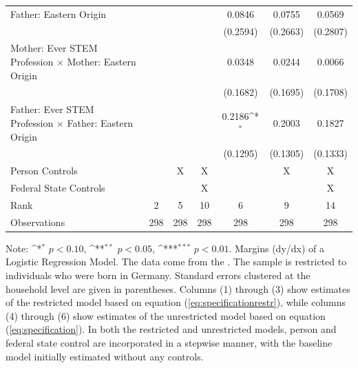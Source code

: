 \documentclass[a4paper, oneside, hyperfootnotes = false]{article}
\def\sym#1{\ifmmode^{#1}\else\(^{#1}\)\fi}
\begin{document}
{\begin{landscape}
\begin{table}[ht]
\begin{center}
{\begin{tabular}{l*{6}{c}}
					\addlinespace
					Father: Eastern Origin&                     &                     &                     &      0.0846         &      0.0755         &      0.0569         \\
					&                     &                     &                     &    (0.2594)         &    (0.2663)         &    (0.2807)         \\
					\addlinespace
					Mother: Ever STEM Profession $\times$ Mother: Eastern Origin&                     &                     &                     &      0.0348         &      0.0244         &      0.0066         \\
					&                     &                     &                     &    (0.1682)         &    (0.1695)         &    (0.1708)         \\
					\addlinespace
					Father: Ever STEM Profession $\times$ Father: Eastern Origin&                     &                     &                     &      0.2186\sym{*}  &      0.2003         &      0.1827         \\
					&                     &                     &                     &    (0.1295)         &    (0.1305)         &    (0.1333)         \\
					\midrule
					Person Controls & & X  & X & & X & X \\
					Federal State Controls & & & X & & & X \\
					Rank                &      2         &      5         &     10         &      6         &      9         &     14         \\
					Observations                   &    298         &    298         &    298         &    298         &    298         &    298         \\
					\bottomrule
			\end{tabular}}
			
			\vspace{2mm}
			
			\parbox{15cm}{
				\linespread{1}\footnotesize Note: \sym{*} \(p<0.10\), \sym{**} \(p<0.05\), \sym{***} \(p<0.01\). Margins (dy/dx) of a Logistic Regression Model. The data come from the \cite{SOEP2023}. The sample is restricted to individuals who were born in Germany. Standard errors clustered at the household level are given in parentheses. Columns (1) through (3) show estimates of the restricted model based on equation (\ref{eq:specificationrestr}), while columns (4) through (6) show estimates of the unrestricted model based on equation (\ref{eq:specification}). In both the restricted and unrestricted models, person and federal state control are incorporated in a stepwise manner, with the baseline model initially estimated without any controls.}
			

\end{center}
\end{table}
\end{landscape}}
\end{document}
